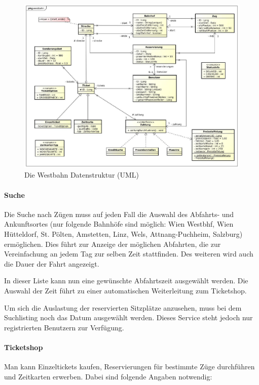 \begin{figure}[h]
    \centering
        \includegraphics[width=\textwidth]{images/westbahn}
    \caption{Die Westbahn Datenstruktur (UML)}
    \label{fig:uml}
\end{figure}

\paragraph{Suche}
Die Suche nach Z{\"u}gen muss auf jeden Fall die Auswahl des Abfahrts- und Ankunftsortes (nur folgende Bahnh{\"o}fe sind m{\"o}glich: Wien Westbhf, Wien H{\"u}tteldorf, St. P{\"o}lten, Amstetten, Linz, Wels, Attnang-Puchheim, Salzburg) erm{\"o}glichen. Dies f{\"u}hrt zur Anzeige der m{\"o}glichen Abfahrten, die zur Vereinfachung an jedem Tag zur selben Zeit stattfinden. Des weiteren wird auch die Dauer der Fahrt angezeigt.

In dieser Liste kann nun eine gew{\"u}nschte Abfahrtszeit ausgew{\"a}hlt werden. Die Auswahl der Zeit f{\"u}hrt zu einer automatischen Weiterleitung zum Ticketshop.

Um sich die Auslastung der reservierten Sitzpl{\"a}tze anzusehen, muss bei dem Suchlisting noch das Datum ausgew{\"a}hlt werden. Dieses Service steht jedoch nur registrierten Benutzern zur Verf{\"u}gung.


\paragraph{Ticketshop}
Man kann Einzeltickets kaufen, Reservierungen f{\"u}r bestimmte Z{\"u}ge durchf{\"u}hren und Zeitkarten erwerben. Dabei sind folgende Angaben notwendig:

